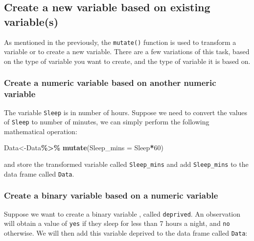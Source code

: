 \documentclass[
]{book}
\newenvironment{Shaded}{\begin{snugshade}}{\end{snugshade}}
\newcommand{\AttributeTok}[1]{\textcolor[rgb]{0.13,0.29,0.53}{#1}}
\newcommand{\DecValTok}[1]{\textcolor[rgb]{0.00,0.00,0.81}{#1}}
\newcommand{\FunctionTok}[1]{\textcolor[rgb]{0.13,0.29,0.53}{\textbf{#1}}}
\newcommand{\NormalTok}[1]{#1}
\newcommand{\OtherTok}[1]{\textcolor[rgb]{0.56,0.35,0.01}{#1}}
\newcommand{\SpecialCharTok}[1]{\textcolor[rgb]{0.81,0.36,0.00}{\textbf{#1}}}
\begin{document}
\hypertarget{create-a-new-variable-based-on-existing-variables-1}{%
\subsection{Create a new variable based on existing variable(s)}\label{create-a-new-variable-based-on-existing-variables-1}}

As mentioned in the previously, the \texttt{mutate()} function is used to transform a variable or to create a new variable. There are a few variations of this task, based on the type of variable you want to create, and the type of variable it is based on.

\hypertarget{create-a-numeric-variable-based-on-another-numeric-variable-1}{%
\subsubsection{Create a numeric variable based on another numeric variable}\label{create-a-numeric-variable-based-on-another-numeric-variable-1}}

The variable \texttt{Sleep} is in number of hours. Suppose we need to convert the values of \texttt{Sleep} to number of minutes, we can simply perform the following mathematical operation:

\begin{Shaded}
\begin{Highlighting}[]
\NormalTok{Data}\OtherTok{\textless{}{-}}\NormalTok{Data}\SpecialCharTok{\%\textgreater{}\%}
  \FunctionTok{mutate}\NormalTok{(}\AttributeTok{Sleep\_mins =}\NormalTok{ Sleep}\SpecialCharTok{*}\DecValTok{60}\NormalTok{)}
\end{Highlighting}
\end{Shaded}

and store the transformed variable called \texttt{Sleep\_mins} and add \texttt{Sleep\_mins} to the data frame called \texttt{Data}.

\hypertarget{create-a-binary-variable-based-on-a-numeric-variable-1}{%
\subsubsection{Create a binary variable based on a numeric variable}\label{create-a-binary-variable-based-on-a-numeric-variable-1}}

Suppose we want to create a binary variable , called \texttt{deprived}. An observation will obtain a value of \texttt{yes} if they sleep for less than 7 hours a night, and \texttt{no} otherwise. We will then add this variable deprived to the data frame called \texttt{Data}:
\end{document}
